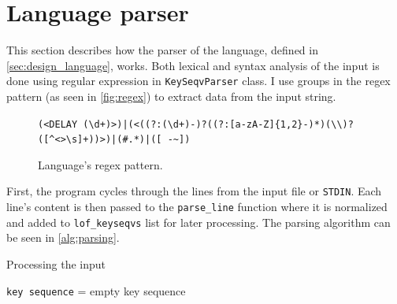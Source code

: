 \section{Language parser}
\label{sec:implementation_parser}
This section describes how the parser of the language, defined in \autoref{sec:design_language}, works. Both lexical and syntax analysis of the input is done using regular expression in \verb|KeySeqvParser| class. I use groups in the regex pattern (as seen in \autoref{fig:regex}) to extract data from the input string.
\begin{figure}[ht]
\centering
\begin{varwidth}{\linewidth}
\footnotesize
\verb=(<DELAY (\d+)>)|(<((?:(\d+)-)?((?:[a-zA-Z]{1,2}-)*)(\\)?([^<>\s]+))>)|(#.*)|([ -~])=
\end{varwidth}
\caption{Language's regex pattern.}
\label{fig:regex}
\end{figure}
First, the program cycles through the lines from the input file or \verb|STDIN|. Each line's content is then passed to the \verb|parse_line| function where it is normalized and added to \verb|lof_keyseqvs| list for later processing. The parsing algorithm can be seen in \autoref{alg:parsing}.
\begin{algorithm}
\caption{Processing the input}
\label{alg:parsing}
\texttt{key sequence} = empty key sequence\;
\end{algorithm}

